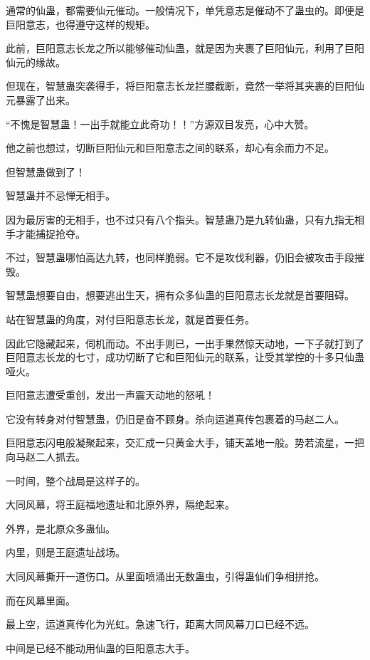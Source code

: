 
\begin{this_body}



通常的仙蛊，都需要仙元催动。一般情况下，单凭意志是催动不了蛊虫的。即便是巨阳意志，也得遵守这样的规矩。

此前，巨阳意志长龙之所以能够催动仙蛊，就是因为夹裹了巨阳仙元，利用了巨阳仙元的缘故。

但现在，智慧蛊突袭得手，将巨阳意志长龙拦腰截断，竟然一举将其夹裹的巨阳仙元暴露了出来。

“不愧是智慧蛊！一出手就能立此奇功！！”方源双目发亮，心中大赞。

他之前也想过，切断巨阳仙元和巨阳意志之间的联系，却心有余而力不足。

但智慧蛊做到了！

智慧蛊并不忌惮无相手。

因为最厉害的无相手，也不过只有八个指头。智慧蛊乃是九转仙蛊，只有九指无相手才能捕捉抢夺。

不过，智慧蛊哪怕高达九转，也同样脆弱。它不是攻伐利器，仍旧会被攻击手段摧毁。

智慧蛊想要自由，想要逃出生天，拥有众多仙蛊的巨阳意志长龙就是首要阻碍。

站在智慧蛊的角度，对付巨阳意志长龙，就是首要任务。

因此它隐藏起来，伺机而动。不出手则已，一出手果然惊天动地，一下子就打到了巨阳意志长龙的七寸，成功切断了它和巨阳仙元的联系，让受其掌控的十多只仙蛊哑火。

巨阳意志遭受重创，发出一声震天动地的怒吼！

它没有转身对付智慧蛊，仍旧是奋不顾身。杀向运道真传包裹着的马赵二人。

巨阳意志闪电般凝聚起来，交汇成一只黄金大手，铺天盖地一般。势若流星，一把向马赵二人抓去。

一时间，整个战局是这样子的。

大同风幕，将王庭福地遗址和北原外界，隔绝起来。

外界，是北原众多蛊仙。

内里，则是王庭遗址战场。

大同风幕撕开一道伤口。从里面喷涌出无数蛊虫，引得蛊仙们争相拼抢。

而在风幕里面。

最上空，运道真传化为光虹。急速飞行，距离大同风幕刀口已经不远。

中间是已经不能动用仙蛊的巨阳意志大手。


\end{this_body}
